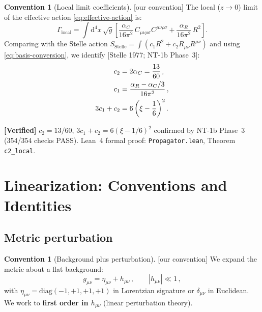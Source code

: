 \documentclass[12pt,a4paper]{article}
\theoremstyle{definition}
\newtheorem{convention}[proposition]{Convention}
\theoremstyle{remark}
\newcommand{\Ricsq}{R_{\mu\nu}R^{\mu\nu}}
\newcommand{\Weylsq}{C_{\mu\nu\rho\sigma}C^{\mu\nu\rho\sigma}}
\newcommand{\dd}{\mathrm{d}}
\newcommand{\fromlit}[1]{\textcolor{blue!70!black}{\textsf{[#1]}}}
\newcommand{\oursign}{\textcolor{teal!80!black}{\textsf{[our convention]}}}
\newcommand{\verified}[1]{%
  \par\smallskip\noindent
  \colorbox{green!10}{\parbox{\dimexpr\linewidth-2\fboxsep}{%
    \textcolor{green!50!black}{\textbf{[Verified]}} #1}}%
  \par\smallskip}
\begin{document}
\begin{convention}[Local limit coefficients]
\label{conv:local-coeffs}
\oursign\;
The local ($z\to 0$) limit of the effective action
\eqref{eq:effective-action} is:
\begin{equation}
  \Gamma_{\text{local}} = \int\dd^4x\,\sqrt{g}\left[
    \frac{\alpha_C}{16\pi^2}\,\Weylsq
    + \frac{\alpha_R}{16\pi^2}\,R^2
  \right].
  \label{eq:local-limit}
\end{equation}
Comparing with the Stelle action
$S_{\text{Stelle}} = \int(c_1 R^2 + c_2 \Ricsq)$
and using \eqref{eq:basis-conversion}, we identify
\fromlit{Stelle 1977; NT-1b Phase~3}:
\begin{align}
  c_2 &= 2\alpha_C = \frac{13}{60}\,,
    \label{eq:c2-local}\\
  c_1 &= \frac{\alpha_R - \alpha_C/3}{16\pi^2}\,,\notag\\
  3c_1 + c_2 &= 6\left(\xi - \frac{1}{6}\right)^2.
    \label{eq:3c1c2-local}
\end{align}
\end{convention}

\verified{$c_2 = 13/60$, $3c_1+c_2 = 6(\xi-1/6)^2$ confirmed by
NT-1b Phase~3 (354/354 checks PASS).  Lean~4 formal proof:
\texttt{Propagator.lean}, Theorem \texttt{c2\_local}.}


\section{Linearization: Conventions and Identities}
\label{sec:linearization}

\subsection{Metric perturbation}

\begin{convention}[Background plus perturbation]
\label{conv:metric-perturbation}
\oursign\;
We expand the metric about a flat background:
\begin{equation}
  g_{\mu\nu} = \eta_{\mu\nu} + h_{\mu\nu}\,,
  \qquad |h_{\mu\nu}| \ll 1\,,
  \label{eq:metric-expansion}
\end{equation}
with $\eta_{\mu\nu} = \text{diag}(-1,+1,+1,+1)$ in Lorentzian
signature or $\delta_{\mu\nu}$ in Euclidean.  We work to
\textbf{first order in $h_{\mu\nu}$} (linear perturbation theory).
\end{convention}
\end{document}
